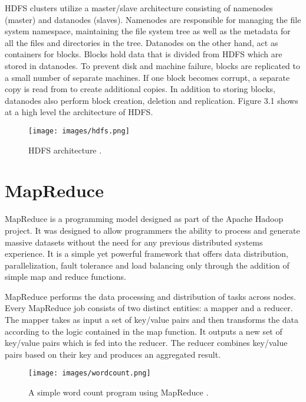 \documentclass[12pt]{report}
\begin{document}
HDFS clusters utilize a master/slave architecture consisting of namenodes (master) and datanodes (slaves). Namenodes are responsible for managing the file system namespace, maintaining the file system tree as well as the metadata for all the files and directories in the tree. Datanodes on the other hand, act as containers for blocks. Blocks hold data that is divided from HDFS which are stored in datanodes. To prevent disk and machine failure, blocks are replicated to a small number of separate machines. If one block becomes corrupt, a separate copy is read from to create additional copies. In addition to storing blocks, datanodes also perform block creation, deletion and replication. Figure 3.1 shows at a high level the architecture of HDFS.



\begin{figure}[H]
\centering
\texttt{[image: images/hdfs.png]}
\caption[HDFS architecture] {HDFS architecture \cite{HDFSFig}.}
\end{figure}

\section{MapReduce}
MapReduce is a programming model designed as part of the Apache Hadoop project. It was designed to allow programmers the ability to process and generate massive datasets without the need for any previous distributed systems experience.  It is a simple yet powerful framework that offers data distribution, parallelization, fault tolerance and load balancing only through the addition of simple map and reduce functions.

MapReduce performs the data processing and distribution of tasks across nodes. Every MapReduce job consists of two distinct entities: a mapper and a reducer. The mapper takes as input a set of key/value pairs and then transforms the data according to the logic contained in the map function. It outputs a new set of key/value pairs which is fed into the reducer. The reducer combines key/value pairs based on their key and produces an aggregated result.

\begin{figure}[H]
\centering
\texttt{[image: images/wordcount.png]}
\caption[Word count using MapReduce] {A simple word count program using MapReduce \cite{wordCountFig}.}
\end{figure}
\end{document}
